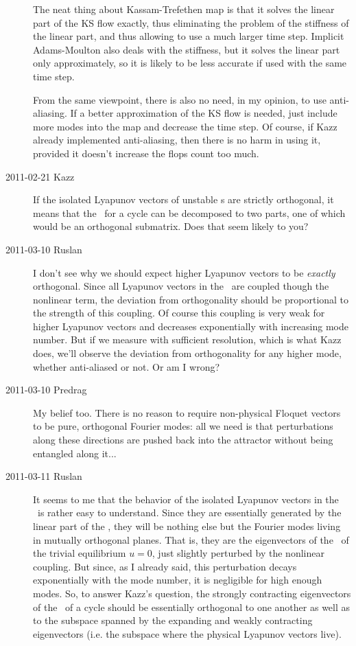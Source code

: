 \begin{description}
The neat thing about Kassam-Trefethen map is that it solves the linear part of the KS flow exactly, thus eliminating the problem of the stiffness of the linear part, and thus allowing to use a much larger time step.  Implicit Adams-Moulton also deals with the stiffness, but it solves the linear part only approximately, so it is likely to be less accurate if used with the same time step.

From the same viewpoint, there is also no need, in my opinion, to use anti-aliasing.  If a better approximation of the KS flow is needed, just include more modes into the map and decrease the time step.  Of course, if Kazz already implemented anti-aliasing, then there is no harm in using it, provided it doesn't increase the flops count too much.

\item[2011-02-21 Kazz]
If the isolated Lyapunov vectors of
{unstable \po}s are strictly orthogonal, it means that the \jacobianM\ for a
cycle can be decomposed to two parts, one of which would be an
orthogonal submatrix. Does that seem likely to you?

\item[2011-03-10 Ruslan]
I don't see why we should expect higher Lyapunov vectors to be {\em exactly} orthogonal.  Since all Lyapunov vectors in the \KSe\ are coupled though the nonlinear term, the deviation from orthogonality should be proportional to the strength of this coupling.  Of course this coupling is very weak for higher Lyapunov vectors and decreases exponentially with increasing mode number.  But if we measure with sufficient resolution, which is what Kazz does, we'll observe the deviation from orthogonality for any higher mode, whether anti-aliased or not.  Or am I wrong?

\item[2011-03-10 Predrag] My belief too. There is no reason to require non-physical Floquet vectors to be pure, orthogonal Fourier modes: all
    we need is that perturbations along these directions are pushed back into
    the attractor without being entangled along it...

\item[2011-03-11 Ruslan] It seems to me that the behavior of the isolated Lyapunov vectors in the \KSe\ is rather easy to understand.  Since they are essentially generated by the linear part of the \KSe, they will be nothing else but the Fourier modes living in mutually orthogonal planes.  That is, they are the eigenvectors of the \jacobianM\ of the trivial equilibrium $u = 0$, just slightly perturbed by the nonlinear coupling.  But since, as I already said, this perturbation decays exponentially with the mode number, it is negligible for high enough modes.  So, to answer Kazz's question, the strongly contracting eigenvectors of the \jacobianM\ of a cycle should be essentially orthogonal to one another as well as to the subspace spanned by the expanding and weakly contracting eigenvectors (i.e. the subspace where the physical Lyapunov vectors live).


\end{description}

